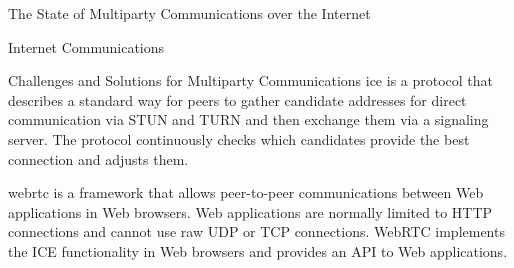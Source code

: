 \begin{frame}[fragile]{The State of Multiparty Communications over the Internet}
\begin{block}{Internet Communications}
\begin{block}{Challenges and Solutions for Multiparty Communications}
\gls{ice} is a protocol that describes a standard way for peers to gather candidate addresses for direct communication via STUN and TURN and then exchange them via a signaling server. The protocol continuously checks which candidates provide the best connection and adjusts them.

\gls{webrtc} is a framework that allows peer-to-peer communications between Web applications in Web browsers. Web applications are normally limited to HTTP connections and cannot use raw UDP or TCP connections. WebRTC implements the ICE functionality in Web browsers and provides an API to Web applications.

\end{block}
\end{block}
\end{frame}

